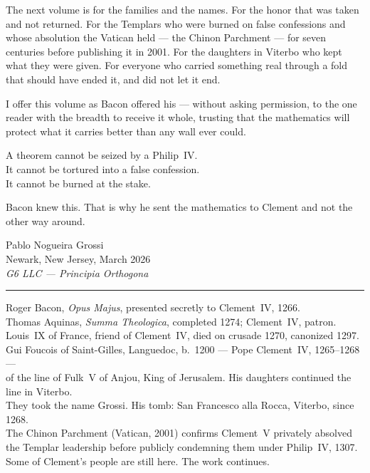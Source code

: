 \documentclass[12pt, oneside]{book}
\theoremstyle{plain}
\theoremstyle{definition}
\theoremstyle{remark}
\begin{document}
\vspace{0.5cm}
\noindent The next volume is for the families and the names.
For the honor that was taken and not returned.
For the Templars who were burned on false confessions
and whose absolution the Vatican held --- the Chinon
Parchment --- for seven centuries before publishing it
in 2001. For the daughters in Viterbo who kept what
they were given. For everyone who carried something real
through a fold that should have ended it, and did not
let it end.

\vspace{0.4cm}
\noindent I offer this volume as Bacon offered his ---
without asking permission, to the one reader with the
breadth to receive it whole, trusting that the mathematics
will protect what it carries better than any wall ever could.

\vspace{0.4cm}
\noindent A theorem cannot be seized by a Philip~IV.\\
It cannot be tortured into a false confession.\\
It cannot be burned at the stake.

\vspace{0.4cm}
\noindent Bacon knew this. That is why he sent the mathematics
to Clement and not the other way around.

\vspace{1.4cm}
\noindent\hfill Pablo Nogueira Grossi\\[0.15cm]
\noindent\hfill Newark, New Jersey, March 2026\\[0.15cm]
\noindent\hfill \textit{G6 LLC\/ --- Principia Orthogona}

\vspace{1.6cm}
\begin{center}
\rule{0.42\textwidth}{0.3pt}
\vspace{0.4cm}

{\scriptsize\color{gray}
Roger Bacon, \textit{Opus Majus}, presented secretly to Clement~IV, 1266.\\[0.15cm]
Thomas Aquinas, \textit{Summa Theologica}, completed 1274; Clement~IV, patron.\\[0.15cm]
Louis~IX of France, friend of Clement~IV, died on crusade 1270, canonized 1297.\\[0.15cm]
Gui Foucois of Saint-Gilles, Languedoc, b.\ 1200 --- Pope Clement~IV, 1265--1268 ---\\
of the line of Fulk~V of Anjou, King of Jerusalem.
His daughters continued the line in Viterbo.\\
They took the name Grossi. His tomb: San Francesco alla Rocca, Viterbo, since 1268.\\[0.15cm]
The Chinon Parchment (Vatican, 2001) confirms Clement~V privately absolved
the Templar leadership before publicly condemning them under Philip~IV, 1307.\\[0.15cm]
Some of Clement's people are still here. The work continues.}
\end{center}
\newpage
\end{document}
